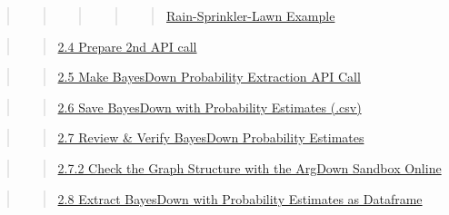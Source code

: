 \documentclass[
  11pt,
  letterpaper,
]{book}
\begin{document}
\begin{quote}
\begin{quote}
\begin{quote}
\begin{quote}
\begin{quote}
\hyperref[scrollTo=Fn72WmgVEOH0]{Rain-Sprinkler-Lawn Example}
\end{quote}
\end{quote}
\end{quote}
\end{quote}
\end{quote}

\begin{quote}
\begin{quote}
\hyperref[scrollTo=d4tB9WD-fIWZ]{2.4 Prepare 2nd API call}
\end{quote}
\end{quote}

\begin{quote}
\begin{quote}
\hyperref[scrollTo=oPWto83lfN9Q]{2.5 Make BayesDown Probability
Extraction API Call}
\end{quote}
\end{quote}

\begin{quote}
\begin{quote}
\hyperref[scrollTo=L8NWpz8MfZ9_]{2.6 Save BayesDown with Probability
Estimates (.csv)}
\end{quote}
\end{quote}

\begin{quote}
\begin{quote}
\hyperref[scrollTo=Q3PTtYgRfsLa]{2.7 Review \& Verify BayesDown
Probability Estimates}
\end{quote}
\end{quote}

\begin{quote}
\begin{quote}
\hyperref[scrollTo=VwoAgBsafonh]{2.7.2 Check the Graph Structure with
the ArgDown Sandbox Online}
\end{quote}
\end{quote}

\begin{quote}
\begin{quote}
\hyperref[scrollTo=19KDn2mKf309]{2.8 Extract BayesDown with Probability
Estimates as Dataframe}
\end{quote}
\end{quote}
\end{document}
